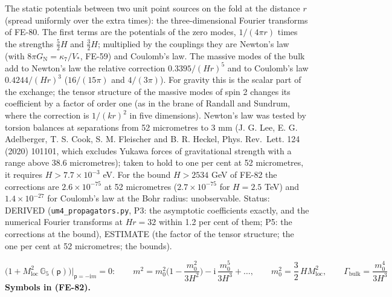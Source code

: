 \documentclass[
  10pt,
]{article}
\begin{document}
The static potentials between two unit point sources on the fold at the
distance \(r\) (spread uniformly over the extra times): the
three-dimensional Fourier transforms of FE-80. The first terms are the
potentials of the zero modes, \(1/(4\pi r)\) times the strengths
\(\frac52H\) and \(\frac32H\); multiplied by the couplings they are
Newton's law (with \(8\pi G_{\mathrm{N}} = \kappa_7/V_*\), FE-59) and
Coulomb's law. The massive modes of the bulk add to Newton's law the
relative correction \(0.3395/(Hr)^5\) and to Coulomb's law
\(0.4244/(Hr)^3\) (\(16/(15\pi)\) and \(4/(3\pi)\)). For gravity this is
the scalar part of the exchange; the tensor structure of the massive
modes of spin 2 changes its coefficient by a factor of order one (as in
the brane of Randall and Sundrum, where the correction is \(1/(kr)^2\)
in five dimensions). Newton's law was tested by torsion balances at
separations from 52 micrometres to 3 mm (J. G. Lee, E. G. Adelberger, T.
S. Cook, S. M. Fleischer and B. R. Heckel, Phys. Rev.~Lett. 124 (2020)
101101, which excludes Yukawa forces of gravitational strength with a
range above 38.6 micrometres); taken to hold to one per cent at 52
micrometres, it requires \(H > 7.7\times10^{-3}\) eV. For the bound
\(H > 2534\) GeV of FE-82 the corrections are \(2.6\times10^{-75}\) at
52 micrometres (\(2.7\times10^{-75}\) for \(H = 2.5\) TeV) and
\(1.4\times10^{-27}\) for Coulomb's law at the Bohr radius:
unobservable. Status: DERIVED (\texttt{um4\_propagators.py}, P3: the
asymptotic coefficients exactly, and the numerical Fourier transforms at
\(Hr = 32\) within 1.2 per cent of them; P5: the corrections at the
bound), ESTIMATE (the factor of the tensor structure; the one per cent
at 52 micrometres; the bounds).

\[
\Big(1 + M_{\mathrm{loc}}^2\,\mathbb{G}_5(\mathsf{p})\Big)\Big\vert_{\mathsf{p} = -\mathrm{i}m} = 0:\qquad
m^2 = m_0^2\Big(1 - \frac{m_0^2}{3H^2}\Big) - \mathrm{i}\,\frac{m_0^5}{3H^3} + \dots,\qquad
m_0^2 = \frac32\,H M_{\mathrm{loc}}^2,\qquad \Gamma_{\mathrm{bulk}} = \frac{m_0^4}{3H^3} \tag{FE-82}
\] \textbf{Symbols in (FE-82).}
\end{document}
